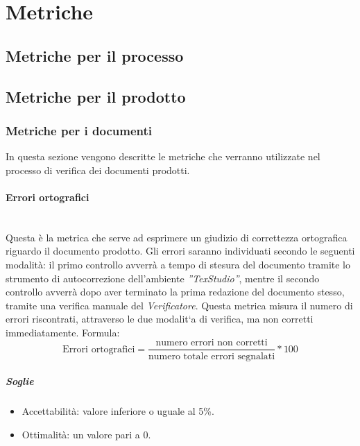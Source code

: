 \pagebreak
\section{Metriche}
\subsection{Metriche per il processo}
\label{AppB:metricheProc}
\subsection{Metriche per il prodotto}
\label{AppB:metricheProd}
\subsubsection{Metriche per i documenti}
\label{AppB:metricheDoc}
In questa sezione vengono descritte le metriche che verranno utilizzate nel processo di verifica dei documenti prodotti.
\paragraph{Errori ortografici}
	~\\Questa è la metrica che serve ad esprimere un giudizio di correttezza ortografica riguardo il documento prodotto. Gli errori saranno individuati secondo le seguenti modalità:
il primo controllo avverrà a tempo di stesura del documento tramite lo strumento di autocorrezione dell'ambiente \emph{''TexStudio''}, mentre il secondo controllo avverrà dopo aver terminato la prima redazione del documento stesso, tramite una verifica manuale del \emph{Verificatore}.
Questa metrica misura il numero di errori riscontrati, attraverso le due modalit`a di verifica, ma
non corretti immediatamente.
\newline Formula:
\begin{displaymath}
\mbox{Errori ortografici}= \frac{\mbox{numero errori non corretti}}{\mbox{numero totale errori segnalati}}*100
\end{displaymath}

\subparagraph{Soglie}
\begin{itemize}
\item Accettabilità: valore inferiore o uguale al 5\%.
\item Ottimalità: un valore pari a 0.
\end{itemize}

